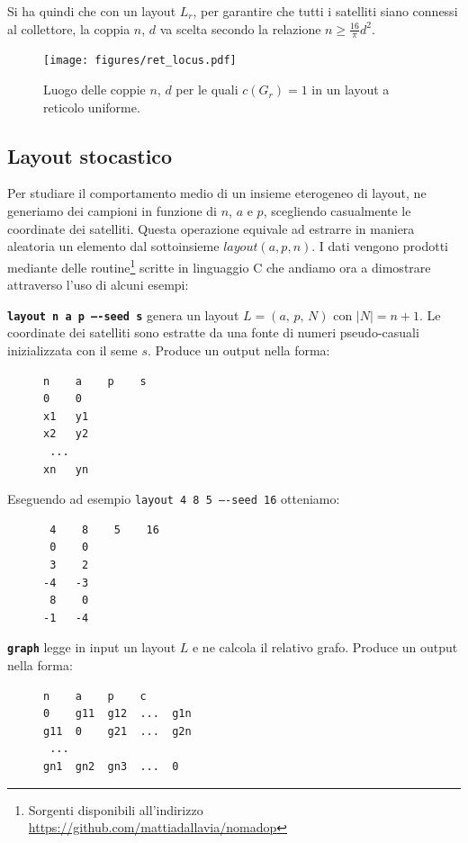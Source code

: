\documentclass[a4paper,11pt]{article}
\theoremstyle{definition}
\begin{document}
Si ha quindi che con un layout $L_r$, per garantire che tutti i satelliti siano connessi al collettore, la coppia $n$, $d$ va scelta secondo la relazione $n \geq \frac{16}{\pi} d^2$.

\begin{figure}[H]
\centering
\texttt{[image: figures/ret\_locus.pdf]}
\caption{Luogo delle coppie $n$, $d$ per le quali $c(G_r) = 1$ in un layout a reticolo uniforme.}
\end{figure}

\subsection{Layout stocastico}

Per studiare il comportamento medio di un insieme eterogeneo di layout, ne generiamo dei campioni in funzione di $n$, $a$ e $p$, scegliendo casualmente le coordinate dei satelliti. Questa operazione equivale ad estrarre in maniera aleatoria un elemento dal sottoinsieme $layout(a, p, n)$. I dati vengono prodotti mediante delle routine\footnote{Sorgenti disponibili all'indirizzo \url{https://github.com/mattiadallavia/nomadop}} scritte in linguaggio C che andiamo ora a dimostrare attraverso l'uso di alcuni esempi:

\texttt{\textbf{layout n a p ----seed s}} genera un layout $L = (a,\,p,\,N)$ con $|N| = n+1$. Le coordinate dei satelliti sono estratte da una fonte di numeri pseudo-casuali inizializzata con il seme $s$. Produce un output nella forma:

\begin{figure}[H]
\centering
\begin{BVerbatim}
n    a    p    s
0    0
x1   y1
x2   y2
 ...
xn   yn
\end{BVerbatim}
\end{figure}

Eseguendo ad esempio \texttt{layout 4 8 5 ----seed 16} otteniamo:

\begin{figure}[H]
\centering
\begin{BVerbatim}
 4    8    5    16
 0    0
 3    2
-4   -3
 8    0
-1   -4
\end{BVerbatim}
\end{figure}

\texttt{\textbf{graph}} legge in input un layout $L$ e ne calcola il relativo grafo. Produce un output nella forma:

\begin{figure}[H]
\centering
\begin{BVerbatim}
n    a    p    c
0    g11  g12  ...  g1n
g11  0    g21  ...  g2n
 ...
gn1  gn2  gn3  ...  0
\end{BVerbatim}
\end{figure}
\end{document}
